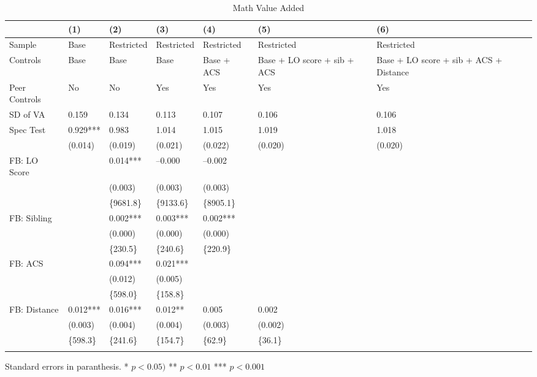 \begin{table}[tbp] \centering
{}

\caption{Math Value Added}
{\footnotesize
\begin{tabularx}{\linewidth}{lCCCCCC}

\toprule
&{(1)}&{(2)}&{(3)}&{(4)}&{(5)}&{(6)} \tabularnewline
\midrule \addlinespace[\belowrulesep]
Sample&Base&Restricted&Restricted&Restricted&Restricted&Restricted \tabularnewline
Controls&Base&Base&Base&Base + ACS&Base + LO score + sib + ACS&Base + LO score + sib + ACS + Distance \tabularnewline
Peer Controls&No&No&Yes&Yes&Yes&Yes \tabularnewline
\midrule SD of VA&0.159&0.134&0.113&0.107&0.106&0.106 \tabularnewline
Spec Test&0.929***&0.983&1.014&1.015&1.019&1.018 \tabularnewline
&(0.014)&(0.019)&(0.021)&(0.022)&(0.020)&(0.020) \tabularnewline
FB: LO Score&&0.014***&--0.000&--0.002&& \tabularnewline
&&(0.003)&(0.003)&(0.003)&& \tabularnewline
&&\{9681.8\}&\{9133.6\}&\{8905.1\}&& \tabularnewline
FB: Sibling&&0.002***&0.003***&0.002***&& \tabularnewline
&&(0.000)&(0.000)&(0.000)&& \tabularnewline
&&\{230.5\}&\{240.6\}&\{220.9\}&& \tabularnewline
FB: ACS&&0.094***&0.021***&&& \tabularnewline
&&(0.012)&(0.005)&&& \tabularnewline
&&\{598.0\}&\{158.8\}&&& \tabularnewline
FB: Distance&0.012***&0.016***&0.012**&0.005&0.002& \tabularnewline
&(0.003)&(0.004)&(0.004)&(0.003)&(0.002)& \tabularnewline
&\{598.3\}&\{241.6\}&\{154.7\}&\{62.9\}&\{36.1\}& \tabularnewline
\bottomrule \addlinespace[\belowrulesep]

\end{tabularx}
\begin{flushleft}
\footnotesize Standard errors in paranthesis. * \(p<0.05)\) ** \(p<0.01\) *** \(p<0.001\)
\end{flushleft}
}
\end{table}
